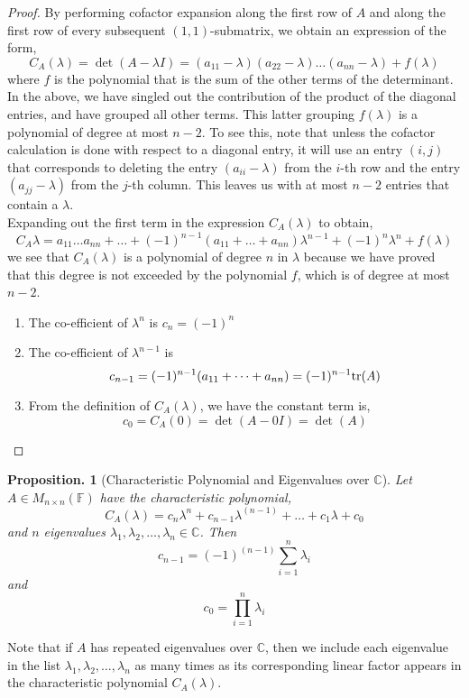 \documentclass[11pt, a4paper]{memoir}
\theoremstyle{change}
\newtheorem{proposition}[theorem]{Proposition.}
\theoremstyle{plain}
\theoremstyle{nonumberplain}
\newtheorem{proof}{Proof}
\numberwithin{equation}{section}
\begin{document}
\begin{proof}
  By performing cofactor expansion along the first row of $A$ and along the first row of every subsequent $(1, 1)$-submatrix, we obtain an expression of the form, 
  $$C_A(\lambda) = \det(A - \lambda I) = (a_{11} - \lambda)(a_{22} - \lambda) \dots (a_{nn} - \lambda) + f(\lambda)$$
  where $f$ is the polynomial that is the sum of the other terms of the determinant. In the above, we have singled out the contribution of the product of the diagonal entries, and have grouped all other terms. This latter grouping $f (\lambda)$ is a polynomial of degree at most $n - 2$. To see this, note that unless the cofactor calculation is done with respect to a diagonal entry, it will use an entry $(i, j)$ that corresponds to deleting the entry $(a_{ii} - \lambda)$ from the $i$-th row and the entry $(a_{jj} - \lambda)$ from the $j$-th column. This leaves us with at most $n - 2$  entries that contain a $\lambda$.
  \\ 
  Expanding out the first term in the expression $C_A(\lambda)$ to obtain,
  $$C_A{\lambda} = a_{11} \dots a_{nn} + \dots + (-1)^{n - 1}(a_{11} + \dots + a_{nn})\lambda^{n - 1} + (-1)^n\lambda ^n + f(\lambda)$$
  we see that $C_A(\lambda)$ is a polynomial of degree $n$ in $\lambda$ because we have proved that this degree is not exceeded by the polynomial $f$, which is of degree at most $n - 2$.
  \begin{enumerate}
    \item The co-efficient of $\lambda^n$ is $c_n = (-1)^n$
    \item The co-efficient of $\lambda ^{n-1}$ is $$c_{n-1} = (-1)^{n -1} (a_{11} + \dots + a_{nn}) = (-1)^{n-1}\space \text{tr}(A)$$
    \item From the definition of $C_A({\lambda})$, we have the constant term is, $$c_0 = C_A(0) = \det(A - 0 I) = \det(A)$$
  \end{enumerate}
\end{proof}
\begin{proposition}[Characteristic Polynomial and Eigenvalues over $\mathbb{C}$]
  Let $A \in M_{n \times n}(\mathbb{F})$ have the characteristic polynomial, $$C_A(\lambda) = c_n\lambda^n + c_{n-1}\lambda^{(n-1)} + \dots + c_1\lambda + c_0$$
  and $n$ eigenvalues $\lambda_1, \lambda_2, \dots, \lambda_n \in \mathbb{C}$. Then $$c_{n - 1} = (-1)^{(n-1)} \sum^{n}_{i = 1}\lambda_i$$ and $$c_0 = \prod^n_{i = 1}\lambda_i$$
\end{proposition}
Note that if $A$ has repeated eigenvalues over $\mathbb{C}$, then we include each eigenvalue in the list $\lambda_1, \lambda_2, \dots, \lambda_n$ as many times as its corresponding linear factor appears in the characteristic polynomial $C_A(\lambda)$.
\end{document}
